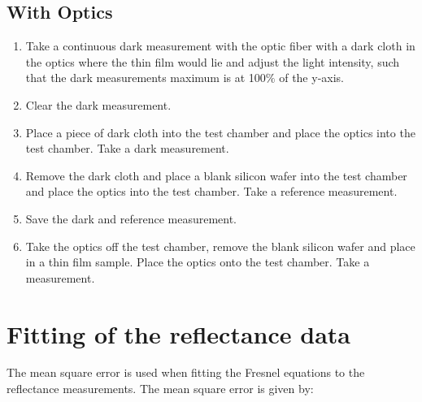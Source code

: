 \documentclass[MasterThesisMain.tex]{subfiles}
\begin{document}
\subsection{With Optics}
\begin{enumerate}
\item Take a continuous dark measurement with the optic fiber with a dark cloth in the optics where the thin film would lie and adjust the light intensity, such that the dark measurements maximum is at 100$\%$ of the y-axis.
\item Clear the dark measurement.
\item Place a piece of dark cloth into the test chamber and place the optics into the test chamber. Take a dark measurement.
\item Remove the dark cloth and place a blank silicon wafer into the test chamber and place the optics into the test chamber. Take a reference measurement.
\item Save the dark and reference measurement.
\item Take the optics off the test chamber, remove the blank silicon wafer and place in a thin film sample. Place the optics onto the test chamber. Take a measurement.
\end{enumerate}

\section{Fitting of the reflectance data} \label{sec:fitting}
The mean square error is used when fitting the Fresnel equations to the reflectance measurements. The mean square error is given by:
\end{document}
